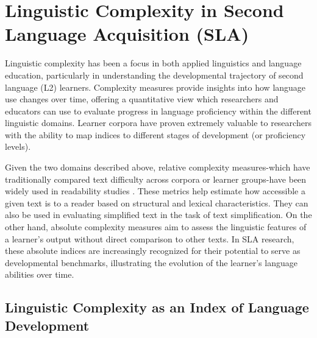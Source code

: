 \section{Linguistic Complexity in Second Language Acquisition (SLA)}


Linguistic complexity has been a focus in both applied linguistics and language education, particularly in
understanding the developmental trajectory of second language (L2) learners. Complexity measures provide insights
into how language use changes over time, offering a quantitative view which researchers and educators can use to
evaluate progress in language proficiency within the different linguistic domains. Learner corpora have proven
extremely valuable to
researchers with the ability to map indices to different stages of development (or proficiency levels).

Given the two domains described above, relative complexity measures-which have traditionally compared text difficulty
across corpora or learner groups-have been widely used in readability studies
\citep{shain2016, Feng2009, dellorletta2011, francois2012-ai,Berendes2018}. These metrics help estimate how accessible a
given
text is to a
reader
based on structural and lexical characteristics. They can also be used in evaluating simplified text in the task of
text simplification. On the other hand, absolute complexity measures aim to assess the linguistic features
of a learner's output without direct comparison to other texts. In SLA research, these absolute indices are
increasingly recognized for their potential to serve as developmental benchmarks, illustrating the evolution of the
learner's language abilities over time.

\subsection{Linguistic Complexity as an Index of Language Development}

